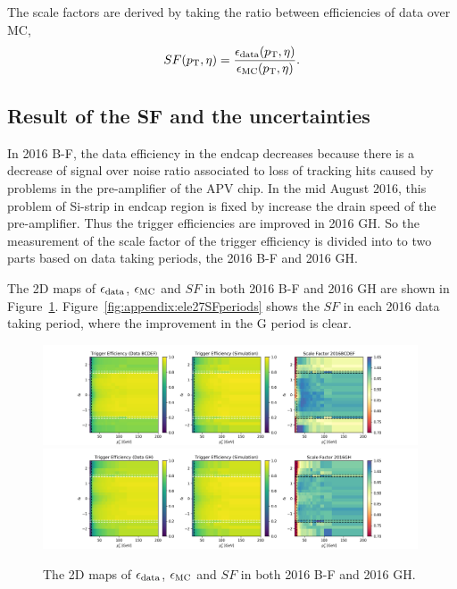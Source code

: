 \noindent The scale factors are derived by taking the ratio between efficiencies of data over MC,
\begin{equation}
SF (p_{\mathrm{T}}, \eta) = \frac{\epsilon_{\rm{data}} (p_{\mathrm{T}}, \eta) }{\epsilon_{\rm{MC}} (p_{\mathrm{T}}, \eta) }.
\end{equation}



\subsection{Result of the SF and the uncertainties}

In 2016 B-F, the data efficiency in the endcap decreases because there is a decrease of signal over noise ratio associated 
to loss of	tracking hits caused by problems in the pre-amplifier of the APV chip. 
In the mid August 2016, this problem of Si-strip in endcap region is fixed by increase the drain speed of the pre-amplifier. Thus the 
trigger efficiencies are improved in 2016 GH. So the measurement of the scale factor of the trigger efficiency is divided into to
two parts based on data taking periods, the 2016 B-F and 2016 GH.

The 2D maps of $\epsilon_{\rm{data}}$, $\epsilon_{\rm{MC}}$ and $SF$ in both 2016 B-F and 2016 GH are shown in Figure~\ref{fig:appendix:ele27SF}. Figure~\ref{fig:appendix:ele27SFperiods} 
shows the $SF$ in each 2016 data taking period, where the improvement in the G period is clear.



\begin{figure}
    \centering
    \includegraphics[width=0.99\textwidth]{chapters/Appendix/sectionEleTrigger/figures/eff2d_BCDEF.png}
    \includegraphics[width=0.99\textwidth]{chapters/Appendix/sectionEleTrigger/figures/eff2d_GH.png}
    \caption{The 2D maps of $\epsilon_{\rm{data}}$, $\epsilon_{\rm{MC}}$ and $SF$ in both 2016 B-F and 2016 GH.}
    \label{fig:appendix:ele27SF}
\end{figure}



